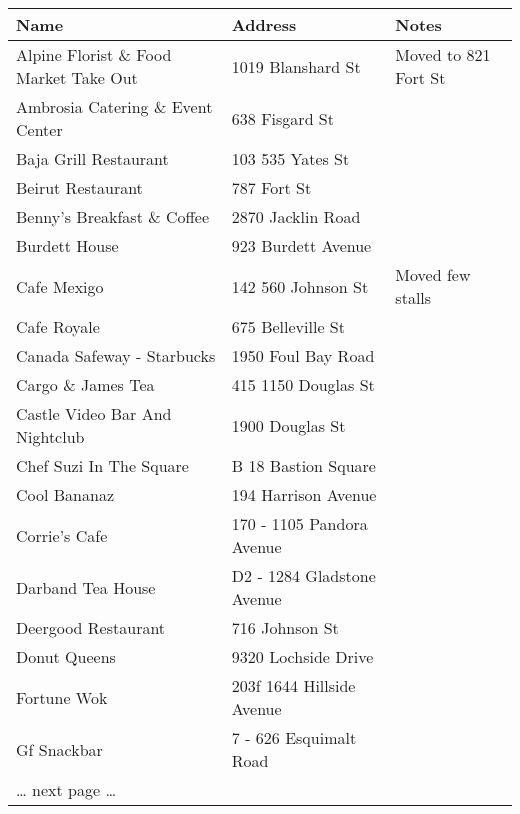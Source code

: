 \documentclass[9pt]{article}
\begin{document}
\begin{center}
\begin{tabular}{l|l|l}
\textbf{Name} & \textbf{Address} & \textbf{Notes}\\
\hline
Alpine Florist \& Food Market Take Out & 1019 Blanshard St & Moved to 821 Fort St\\
Ambrosia Catering \& Event Center & 638 Fisgard St & \\
Baja Grill Restaurant & 103 535 Yates St & \\
Beirut Restaurant & 787 Fort St & \\
Benny's Breakfast \& Coffee & 2870 Jacklin Road & \\
Burdett House & 923 Burdett Avenue & \\
Cafe Mexigo & 142 560 Johnson St & Moved few stalls\\
Cafe Royale & 675 Belleville St & \\
Canada Safeway - Starbucks & 1950 Foul Bay Road & \\
Cargo \& James Tea & 415 1150 Douglas St & \\
Castle Video Bar And Nightclub & 1900 Douglas St & \\
Chef Suzi In The Square & B 18 Bastion Square & \\
Cool Bananaz & 194 Harrison Avenue & \\
Corrie's Cafe & 170 - 1105 Pandora Avenue & \\
Darband Tea House & D2 - 1284 Gladstone Avenue & \\
Deergood Restaurant & 716 Johnson St & \\
Donut Queens & 9320 Lochside Drive & \\
Fortune Wok & 203f 1644 Hillside Avenue & \\
Gf Snackbar & 7 - 626 Esquimalt Road & \\
\ldots{} next page \ldots{} &  & \\
\end{tabular}
\end{center}
\end{document}
